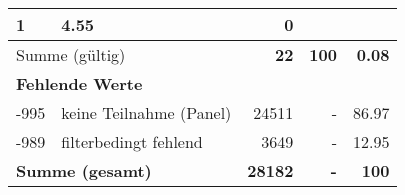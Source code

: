 \begin{longtable}{lXrrr}
       \num{1} &
       \num[round-mode=places,round-precision=2]{4,55} &
         \num[round-mode=places,round-precision=2]{0} \\
     \midrule
     \multicolumn{2}{l}{Summe (gültig)} &
       \textbf{\num{22}} &
     \textbf{100} &
       \textbf{\num[round-mode=places,round-precision=2]{0,08}} \\
     \multicolumn{5}{l}{\textbf{Fehlende Werte}}\\
       -995 &
       keine Teilnahme (Panel) &
         \num{24511} &
        - &
         \num[round-mode=places,round-precision=2]{86,97} \\
       -989 &
       filterbedingt fehlend &
         \num{3649} &
        - &
         \num[round-mode=places,round-precision=2]{12,95} \\
     \midrule
     \multicolumn{2}{l}{\textbf{Summe (gesamt)}} &
          \textbf{\num{28182}} &
        \textbf{-} &
        \textbf{100} \\
     \bottomrule
     \end{longtable}
     
